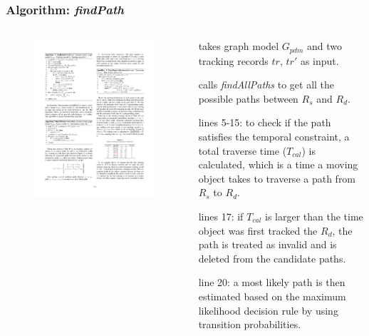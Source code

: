 
\begin{frame}
\frametitle{Algorithm: \emph{findPath}}

\begin{columns}

  \begin{figure}[tb]
    \includegraphics[width=\columnwidth]{figures/3-3/3-3-8.pdf}
  \end{figure}

  \begin{sitemize}
    \item takes graph model $G_{pdm}$ and two tracking records $tr$, $tr'$ as input.
    \item calls \emph{findAllPaths} to get all the possible paths between $R_s$ and $R_d$.
    \item lines 5-15: to check if the path satisfies the temporal constraint, a total traverse time ($T_{cal}$) is calculated, which is a time a moving object takes to traverse a path from $R_s$ to $R_d$.
    \item lines 17: if $T_{cal}$ is larger than the time object was first tracked the $R_d$, the path is treated as invalid and is deleted from the candidate paths.
    \item line 20: a most likely path is then estimated based on the maximum likelihood decision rule by using transition probabilities.
  \end{sitemize}

\end{columns}

\end{frame}


